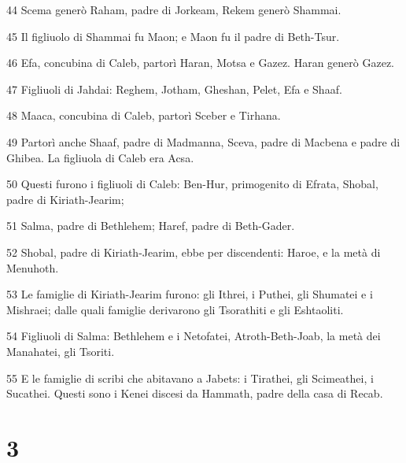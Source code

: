 \par 44 Scema generò Raham, padre di Jorkeam, Rekem generò Shammai.
\par 45 Il figliuolo di Shammai fu Maon; e Maon fu il padre di Beth-Tsur.
\par 46 Efa, concubina di Caleb, partorì Haran, Motsa e Gazez. Haran generò Gazez.
\par 47 Figliuoli di Jahdai: Reghem, Jotham, Gheshan, Pelet, Efa e Shaaf.
\par 48 Maaca, concubina di Caleb, partorì Sceber e Tirhana.
\par 49 Partorì anche Shaaf, padre di Madmanna, Sceva, padre di Macbena e padre di Ghibea. La figliuola di Caleb era Acsa.
\par 50 Questi furono i figliuoli di Caleb: Ben-Hur, primogenito di Efrata, Shobal, padre di Kiriath-Jearim;
\par 51 Salma, padre di Bethlehem; Haref, padre di Beth-Gader.
\par 52 Shobal, padre di Kiriath-Jearim, ebbe per discendenti: Haroe, e la metà di Menuhoth.
\par 53 Le famiglie di Kiriath-Jearim furono: gli Ithrei, i Puthei, gli Shumatei e i Mishraei; dalle quali famiglie derivarono gli Tsorathiti e gli Eshtaoliti.
\par 54 Figliuoli di Salma: Bethlehem e i Netofatei, Atroth-Beth-Joab, la metà dei Manahatei, gli Tsoriti.
\par 55 E le famiglie di scribi che abitavano a Jabets: i Tirathei, gli Scimeathei, i Sucathei. Questi sono i Kenei discesi da Hammath, padre della casa di Recab.

\chapter{3}

